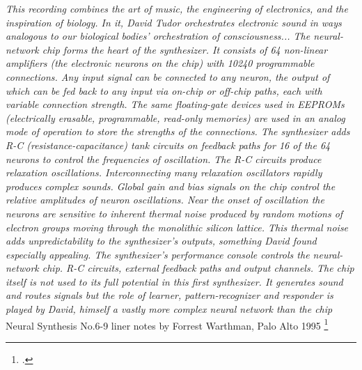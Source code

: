 \begin{center}
\vspace{0.5cm}
\textit{This recording combines the art of music, the engineering of electronics,
and the inspiration of biology. In it,
David Tudor orchestrates electronic sound in ways analogous to
our biological bodies' orchestration of consciousness...
The neural-network chip forms the heart of the synthesizer.
It consists of 64 non-linear amplifiers (the electronic neurons on the chip)
with 10240 programmable connections.
Any input signal can be connected to any neuron,
the output of which can be fed back to any input via on-chip or off-chip paths,
each with variable connection strength. The same floating-gate devices used in EEPROMs
(electrically erasable, programmable, read-only memories)
are used in an analog mode of operation to store the strengths of the connections.
The synthesizer adds R-C (resistance-capacitance) tank circuits on feedback
paths for 16 of the 64 neurons to control the frequencies of oscillation.
The R-C circuits produce relaxation oscillations.
Interconnecting many relaxation oscillators rapidly produces complex sounds.
Global gain and bias signals on the chip control the relative amplitudes of neuron oscillations.
Near the onset of oscillation the neurons are sensitive to inherent
thermal noise produced by random motions of electron groups moving through
the monolithic silicon lattice. This thermal noise adds unpredictability
to the synthesizer’s outputs, something David found especially appealing.
The synthesizer’s performance console controls the neural-network chip.
R-C circuits, external feedback paths and output channels.
The chip itself is not used to its full potential in this first synthesizer.
It generates sound and routes signals but the role of learner,
pattern-recognizer and responder is played by David, himself a vastly
more complex neural network than the chip}
\vspace{0.5cm}
Neural Synthesis No.6-9 liner notes by Forrest Warthman, Palo Alto 1995
\footcite{http://www.lovely.com/albumnotes/notes1602.html}
\vspace{0.5cm}
\end{center}

